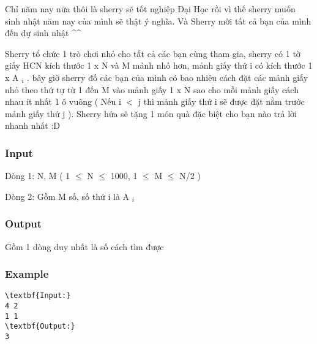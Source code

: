 



   Chỉ năm nay nữa thôi là sherry sẽ tốt nghiệp Đại Học rồi vì thế sherry muốn sinh nhật năm nay của mình sẽ thật ý nghĩa. Và Sherry mời tất cả bạn của mình đến dự sinh nhật \textasciicircum\textasciicircum  

   Sherry tổ chức 1 trò chơi nhỏ cho tất cả các bạn cùng tham gia, sherry có 1 tờ giấy HCN kích thước 1 x N và M mảnh nhỏ hơn, mảnh giấy thứ i có kích thước 1 x A   $_    i   $   . bây giờ sherry đố các bạn của mình có bao nhiêu cách đặt các mảnh giấy nhỏ theo thứ tự từ 1 đến M  vào mảnh giấy 1 x N sao cho mỗi mảnh giấy cách nhau ít nhất 1 ô vuông ( Nếu i $<$ j thì mảnh giấy thứ i sẽ được đặt nằm trước mảnh giấy thứ j ). Sherry hứa sẽ tặng 1 món quà đặc biệt cho bạn nào trả lời nhanh nhất :D  

\subsubsection{   Input  }

   Dòng 1: N, M ( 1  $\le$  N  $\le$  1000, 1  $\le$  M  $\le$  N/2 )  

   Dòng 2: Gồm M số, số  thứ  i  là   A   $_    i   $

\subsubsection{   Output  }

   Gồm 1 dòng duy nhất là số cách tìm được  

\subsubsection{   Example  }
\begin{verbatim}
\textbf{Input:}
4 2
1 1
\textbf{Output:}
3
\end{verbatim}
